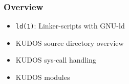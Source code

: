 \begin{frame}

\frametitle{Overview}

\begin{itemize}

\item \texttt{ld(1)}: Linker-scripts with GNU-ld

\item KUDOS source directory overview

\item KUDOS sys-call handling

\item KUDOS modules

\end{itemize}

\end{frame}
